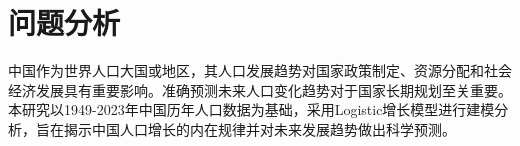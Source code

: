 \section{问题分析}

中国作为世界人口大国或地区，其人口发展趋势对国家政策制定、资源分配和社会经济发展具有重要影响。准确预测未来人口变化趋势对于国家长期规划至关重要。本研究以1949-2023年中国历年人口数据为基础，采用Logistic增长模型进行建模分析，旨在揭示中国人口增长的内在规律并对未来发展趋势做出科学预测。
